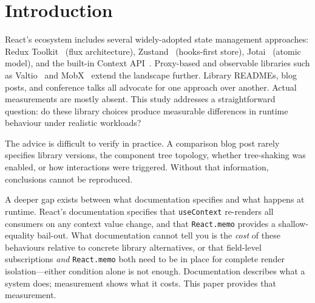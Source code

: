 \documentclass[conference]{IEEEtran}
\newcommand{\code}[1]{\texttt{\small #1}}
\begin{document}
\section{Introduction}

React's ecosystem includes several widely-adopted state management
approaches: Redux Toolkit~\cite{b1} (flux architecture),
Zustand~\cite{b2} (hooks-first store), Jotai~\cite{b3} (atomic model),
and the built-in Context API~\cite{b4}. Proxy-based and observable
libraries such as Valtio~\cite{b16} and MobX~\cite{b17} extend the
landscape further. Library READMEs, blog posts, and conference talks all
advocate for one approach over another. Actual measurements are mostly absent.
This study addresses a straightforward question: do these library choices
produce measurable differences in runtime behaviour under realistic workloads?

The advice is difficult to verify in practice. A comparison blog post rarely
specifies library versions, the component tree topology, whether
tree-shaking was enabled, or how interactions were triggered. Without that
information, conclusions cannot be reproduced.

A deeper gap exists between what documentation specifies and what happens
at runtime. React's documentation specifies that
\code{useContext} re-renders all consumers on any context value change,
and that \code{React.memo} provides a shallow-equality bail-out. What
documentation cannot tell you is the \emph{cost} of these behaviours
relative to concrete library alternatives, or that field-level
subscriptions \emph{and} \code{React.memo} both need to be in place for
complete render isolation---either condition alone is not enough.
Documentation describes what a system does; measurement shows what it costs.
This paper provides that measurement.
\end{document}

